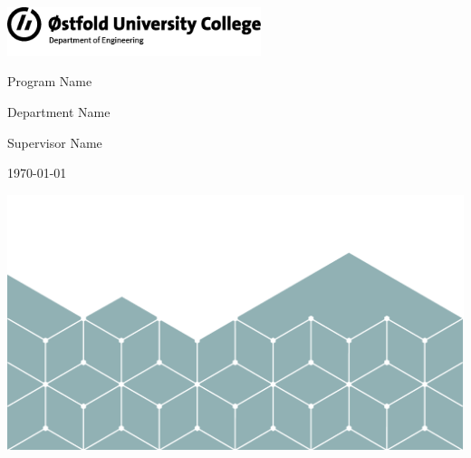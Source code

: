 
\begin{titlepage}

    \begin{flushright}
        \includegraphics*[width=74mm]{images/logo.png}
    \end{flushright}

    \vspace{2cm}



    {\LARGE \textbf{\thesisTitle}}

    \vspace{0.5cm}

    {\large \thesisSubtitle}

    \vspace{1cm}

    {\large \authorName}


    \vspace{1cm}

    {\large Program Name}

    \vspace{0.5cm}

    {\large Department Name}

    \vspace{1cm}

    {\large Supervisor Name}

    \vspace{2cm}

    {\large \today}

    \centering
    \vspace*{\fill}
    \includegraphics*[width=\textwidth]{images/cover.png}

    \thispagestyle{empty} %
\end{titlepage}
